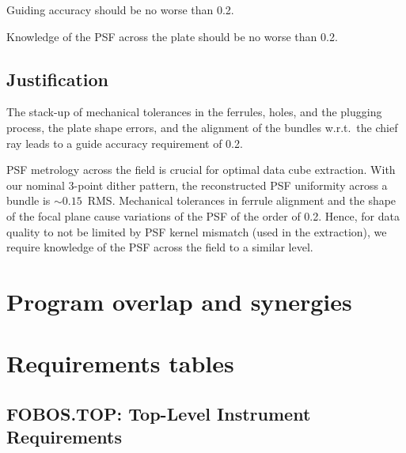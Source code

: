 \documentclass[11pt,a4paper,twoside,onecolumn,openany,final,oldfontcommands]{memoir}
\begin{document}
\begin{requirement}

\reqitem Guiding accuracy should be no worse than 0.2\arcsec.
    
\reqitem Knowledge of the PSF across the plate should be no worse than 0.2\arcsec.
    
\end{requirement}

\subsection{Justification}

The stack-up of mechanical tolerances in the ferrules, holes, and the plugging process, the plate shape errors, and the alignment of the bundles w.r.t.\ the chief ray leads to a guide accuracy requirement of 0.2\arcsec.

PSF metrology across the field is crucial for optimal data cube extraction. With our nominal 3-point dither pattern, the reconstructed PSF uniformity across a bundle is $\sim 0.15$\arcsec\ RMS. Mechanical tolerances in ferrule alignment and  the shape of the focal plane cause variations of the PSF of the order of 0.2\arcsec. Hence, for data quality to not be limited by PSF kernel mismatch (used in the extraction),  we require knowledge of the PSF across the field to a similar level.

\section{Program overlap and synergies}


\section{Requirements tables}
\subsection{FOBOS.TOP: Top-Level Instrument Requirements}
\end{document}
